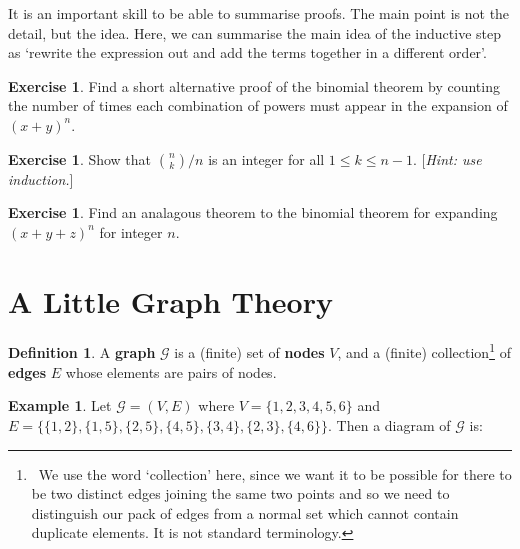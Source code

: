\documentclass[a4paper]{amsart}
\theoremstyle{definition}
\newtheorem{defn}[thm]{Definition}
\newtheorem{ex}[thm]{Example}
\newtheorem{exercise}[thm]{Exercise}
\theoremstyle{remark}
\begin{document}
It is an important skill to be able to summarise proofs. The main point is not the detail, but the idea. Here, we can summarise
the main idea of the inductive step as `rewrite the expression out and add the terms together in a different order'.

\begin{exercise}
  Find a short alternative proof of the binomial theorem by counting the number of times each combination of powers must
  appear in the expansion of $ (x + y)^n $.
\end{exercise}

\begin{exercise}
  Show that $ \binom{n}{k}/n $ is an integer for all $ 1 \leq k \leq n - 1 $. [\emph{Hint: use induction.}]
\end{exercise}

\begin{exercise}
  Find an analagous theorem to the binomial theorem for expanding $ (x + y + z)^n $ for integer $ n $.
\end{exercise}

\section{A Little Graph Theory}
\begin{defn}
  A \textbf{graph} $ \mathcal{G} $ is a (finite) set of \textbf{nodes} $ V $, and a (finite) collection\footnote{~We use the word `collection'
  here, since we want it to be possible for there to be two distinct edges joining the same two points and so we need to distinguish our pack
  of edges from a normal set which cannot contain duplicate elements. It is not standard terminology.} of \textbf{edges} $ E $ whose
  elements are pairs of nodes.
\end{defn}

\begin{ex}\label{ex:graphg}
  Let $ \mathcal{G} = (V, E) $ where $ V = \{1, 2, 3, 4, 5, 6\} $ and $ E = \{\{1, 2\},\allowbreak \{1, 5\},\allowbreak \{2, 5\},\allowbreak
  \{4, 5\},\allowbreak \{3, 4\},\allowbreak \{2, 3\},\allowbreak \{4,6\}\} $. Then a diagram of $ \mathcal{G} $ is:
  \begin{center}
  \end{center}
\end{ex}
\end{document}
